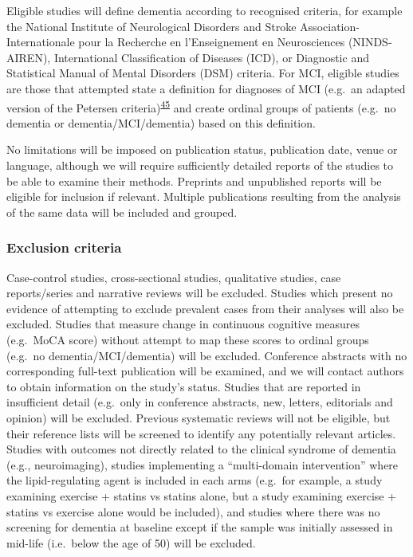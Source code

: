 \documentclass[a4paper, twoside]{templates/ociamthesis}
\begin{document}
Eligible studies will define dementia according to recognised criteria, for example the National Institute of Neurological Disorders and Stroke Association-Internationale pour la Recherche en l'Enseignement en Neurosciences (NINDS-AIREN), International Classification of Diseases (ICD), or Diagnostic and Statistical Manual of Mental Disorders (DSM) criteria. For MCI, eligible studies are those that attempted state a definition for diagnoses of MCI (e.g.~an adapted version of the Petersen criteria)\textsuperscript{\protect\hyperlink{ref-petersen1999}{45}} and create ordinal groups of patients (e.g.~no dementia or dementia/MCI/dementia) based on this definition.

No limitations will be imposed on publication status, publication date, venue or language, although we will require sufficiently detailed reports of the studies to be able to examine their methods. Preprints and unpublished reports will be eligible for inclusion if relevant. Multiple publications resulting from the analysis of the same data will be included and grouped.

\hypertarget{exclusion-criteria}{%
\subsubsection{Exclusion criteria}\label{exclusion-criteria}}

Case-control studies, cross-sectional studies, qualitative studies, case reports/series and narrative reviews will be excluded. Studies which present no evidence of attempting to exclude prevalent cases from their analyses will also be excluded. Studies that measure change in continuous cognitive measures (e.g.~MoCA score) without attempt to map these scores to ordinal groups (e.g.~no dementia/MCI/dementia) will be excluded. Conference abstracts with no corresponding full-text publication will be examined, and we will contact authors to obtain information on the study's status. Studies that are reported in insufficient detail (e.g.~only in conference abstracts, new, letters, editorials and opinion) will be excluded. Previous systematic reviews will not be eligible, but their reference lists will be screened to identify any potentially relevant articles. Studies with outcomes not directly related to the clinical syndrome of dementia (e.g., neuroimaging), studies implementing a ``multi-domain intervention'' where the lipid-regulating agent is included in each arms (e.g.~for example, a study examining exercise + statins vs statins alone, but a study examining exercise + statins vs exercise alone would be included), and studies where there was no screening for dementia at baseline except if the sample was initially assessed in mid-life (i.e.~below the age of 50) will be excluded.
\end{document}
